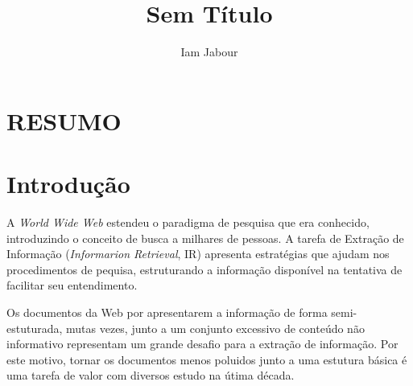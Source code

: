 \documentclass{acm_proc_article-sp}
\newcommand{\remove}[1]{}
\numberwithin{equation}{section}
\begin{document}
\title{Sem Título}

\author{
\alignauthor
Iam Jabour  
\and \alignauthor {}
}


\maketitle

\begin{abstract}


\end{abstract}

\section*{RESUMO}\normalsize %







\section{Introdução}

A {\it World Wide Web} estendeu o paradigma de pesquisa que era conhecido, 
	introduzindo o conceito de busca a milhares de pessoas.
A tarefa de Extração de Informação ({\it Informarion Retrieval}, IR) apresenta 
	estratégias que ajudam nos procedimentos de pequisa, estruturando a 
	informação disponível na tentativa de facilitar seu entendimento.

Os documentos da Web por apresentarem a informação de forma semi-estuturada,
	mutas vezes, junto a um conjunto excessivo de conteúdo não informativo
	representam um grande desafio para a extração de informação. 
Por este motivo,
	tornar os documentos menos poluidos junto a uma estutura básica
	é uma tarefa de valor com diversos estudo na útima década.
\remove{Retirar uma parcela de informação não relevante desses documentos 
	proporciona benefícios claros.}
\end{document}
